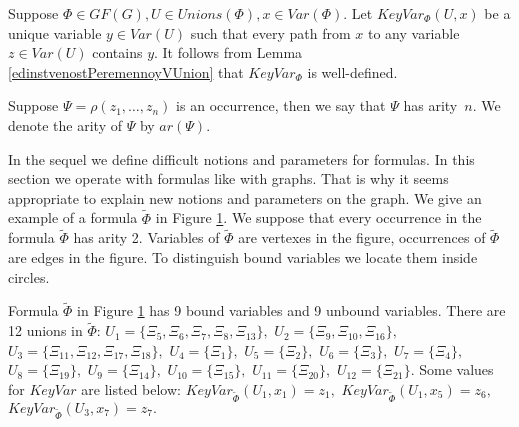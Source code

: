 \documentclass{au}
\theoremstyle{plain}
\theoremstyle{definition}
\theoremstyle{remark}
\numberwithin{equation}{section}
\begin{document}
Suppose $\Phi\in GF(G), U \in Unions(\Phi), x \in Var(\Phi).$
Let $KeyVar_{\Phi}(U,x)$ be a unique variable $y\in Var(U)$
such that every path from $x$ to any variable $z\in Var(U)$ contains $y.$
It follows from Lemma \ref{edinstvenostPeremennoyVUnion} that
$KeyVar_{\Phi}$ is well-defined.

Suppose $\Psi = \rho(z_{1},\ldots,z_{n})$ is an occurrence,
then we say that $\Psi$ has arity~$n.$
We denote the arity of $\Psi$ by $ar(\Psi).$

In the sequel we define difficult notions and parameters for formulas.
In this section we operate with formulas like with graphs.
That is why it seems
appropriate to explain new notions and parameters on the graph.
We give an example of a formula $\widetilde \Phi$ in Figure \ref{bigExample}.
We suppose that every occurrence in the formula $\widetilde \Phi$ has arity 2.
Variables of $\widetilde \Phi$ are vertexes in the figure, occurrences of $\widetilde \Phi$ are edges in the figure.
To distinguish bound variables we locate them inside circles.

\begin{figure}
\centerline{
}
\caption{}\label{bigExample}
\end{figure}

Formula $\widetilde \Phi$ in Figure \ref{bigExample} has 9 bound variables and 9 unbound variables.
There are 12 unions in $\widetilde \Phi$:
$U_{1} = \{\Xi_{5},\Xi_{6},\Xi_{7},\Xi_{8},\Xi_{13}\},$
$U_{2} = \{\Xi_{9},\Xi_{10},\Xi_{16}\},$
$U_{3} = \{\Xi_{11},\Xi_{12},\Xi_{17},\Xi_{18}\},$
$U_{4} = \{\Xi_{1}\},$
$U_{5} = \{\Xi_{2}\},$
$U_{6} = \{\Xi_{3}\},$
$U_{7} = \{\Xi_{4}\},$
$U_{8} = \{\Xi_{19}\},$
$U_{9} = \{\Xi_{14}\},$
$U_{10} = \{\Xi_{15}\},$
$U_{11} = \{\Xi_{20}\},$
$U_{12} = \{\Xi_{21}\}.$
Some values for $KeyVar$ are listed below:
$KeyVar_{\widetilde \Phi}(U_{1},x_{1})=z_{1},$
$KeyVar_{\widetilde \Phi}(U_{1},x_{5})=z_{6},$
$KeyVar_{\widetilde \Phi}(U_{3},x_{7})=z_{7}.$
\end{document}
